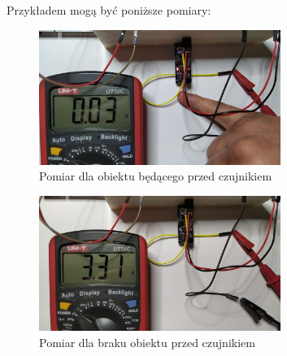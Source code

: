 \documentclass[11pt, a4paper]{article}
\begin{document}
Przykładem mogą być poniższe pomiary:
\begin{figure}[H]
    \centering
    \includegraphics[width=0.7\textwidth]{fig/KY-032/zasada_dzialania/Avoidance_pomiar2.jpg}
    \caption{Pomiar dla obiektu będącego przed czujnikiem}
\end{figure}
\begin{figure}[H]
    \centering
    \includegraphics[width=0.7\textwidth]{fig/KY-032/zasada_dzialania/Avoidance_pomiar3.jpg}
    \caption{Pomiar dla braku obiektu przed czujnikiem}
\end{figure}

\newpage

\printbibliography[heading=bibintoc]
\end{document}
